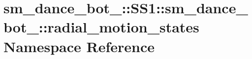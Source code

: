 \hypertarget{namespacesm__dance__bot__3_1_1SS1_1_1sm__dance__bot__3_1_1radial__motion__states}{}\section{sm\+\_\+dance\+\_\+bot\+\_\+:\+:S\+S1\+:\+:sm\+\_\+dance\+\_\+bot\+\_\+:\+:radial\+\_\+motion\+\_\+states Namespace Reference}
\label{namespacesm__dance__bot__3_1_1SS1_1_1sm__dance__bot__3_1_1radial__motion__states}
